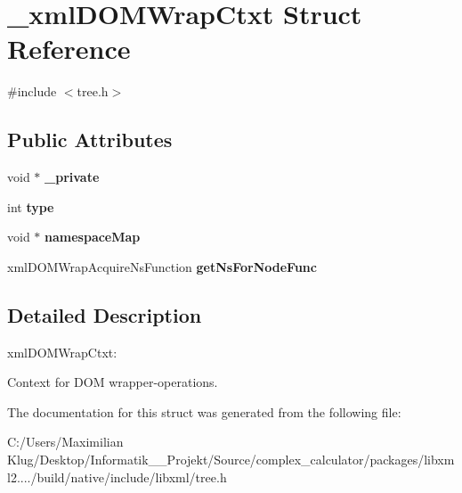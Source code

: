 \hypertarget{struct__xml_d_o_m_wrap_ctxt}{}\section{\+\_\+xml\+D\+O\+M\+Wrap\+Ctxt Struct Reference}
\label{struct__xml_d_o_m_wrap_ctxt}


{\ttfamily \#include $<$tree.\+h$>$}

\subsection*{Public Attributes}
\begin{DoxyCompactItemize}
\item 
\mbox{\label{struct__xml_d_o_m_wrap_ctxt_ad3411d16697c0b7773be3e0719c75381}} 
void $\ast$ {\bfseries \+\_\+private}
\item 
\mbox{\label{struct__xml_d_o_m_wrap_ctxt_a1d84b623242d09de1c0ea065e5411fbc}} 
int {\bfseries type}
\item 
\mbox{\label{struct__xml_d_o_m_wrap_ctxt_ab39bb319265ac6962e847a0874cdbabd}} 
void $\ast$ {\bfseries namespace\+Map}
\item 
\mbox{\label{struct__xml_d_o_m_wrap_ctxt_a2fc065d32c83c5d1cdbd49f8162c7340}} 
xml\+D\+O\+M\+Wrap\+Acquire\+Ns\+Function {\bfseries get\+Ns\+For\+Node\+Func}
\end{DoxyCompactItemize}


\subsection{Detailed Description}
xml\+D\+O\+M\+Wrap\+Ctxt\+:

Context for D\+OM wrapper-\/operations. 

The documentation for this struct was generated from the following file\+:\begin{DoxyCompactItemize}
\item 
C\+:/\+Users/\+Maximilian Klug/\+Desktop/\+Informatik\+\_\+\_\+\+Projekt/\+Source/complex\+\_\+calculator/packages/libxml2..../build/native/include/libxml/tree.\+h\end{DoxyCompactItemize}
